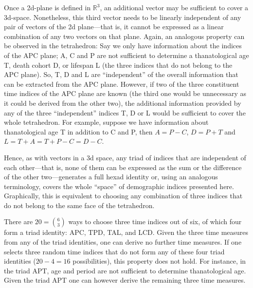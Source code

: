 \documentclass[12pt,oneside,a4paper]{article} %
\begin{document}

Once a 2d-plane is defined in $\mathbb{R}^3$, an additional vector may be sufficient to cover a
3d-space. Nonetheless, this third vector needs to be linearly independent
of any pair of vectors of the 2d plane---that is, it cannot be expressed as a
linear combination of any two vectors on that plane. Again, an analogous
property can be observed in the tetrahedron: Say we only have information about
the indices of the APC plane; A, C and P are not sufficient to determine a thanatological age T, death cohort D, or lifespan L (the three indices that do not belong to the APC plane). So, T, D and L are ``independent'' of the overall information that can be extracted from the APC plane. However, if two of the three constituent time indices of the APC plane are known (the third one would be unnecessary as it could be derived from the other two), the additional information provided by any of the three ``independent'' indices T, D or L would be sufficient to cover the whole tetrahedron. For example, suppose we have information about thanatological age T in addition to C and P, then $A=P-C$, $D=P+T$ and $L=T+A=T+P-C=D-C$. 

Hence, as with vectors in a 3d space, any
triad of indices that are independent of each other---that is, none of them can
be expressed as the sum or the difference of the other two---generates a full
hexad identity or, using an analogous terminology, covers the whole ``space'' of
demographic indices presented here. Graphically, this is equivalent to
choosing any combination of three indices that do not belong to the same face
of the tetrahedron.%

There are $20=\binom{6}{3}$ ways to choose three time indices out of
six, of which four form a triad identity: APC, TPD, TAL, and LCD.
Given the three time measures from any of the
triad identities, one can derive no further time measures. If one selects three
random time indices that do not form any of these four triad identities
($20-4=16$ possibilities), this property does not hold. For instance, in the
triad APT, age and period are not sufficient to determine thanatological age.
Given the triad APT one can however derive the remaining three time measures.
\end{document}
